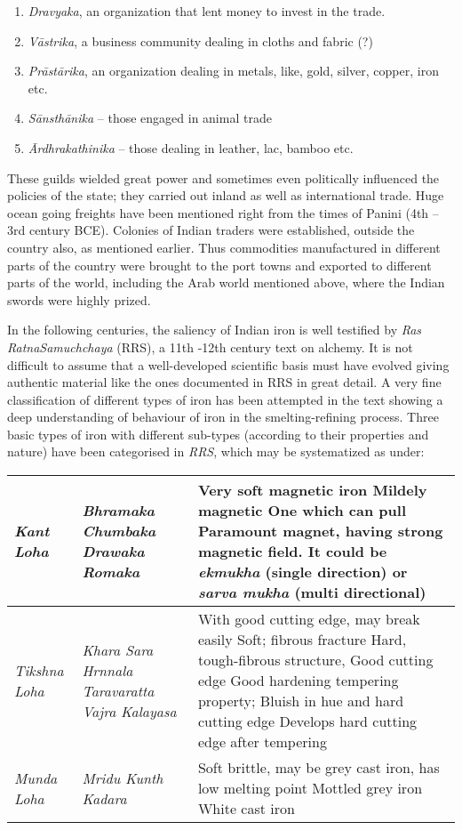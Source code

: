 \begin{enumerate}
\item \textit{Dravyaka}, an organization that lent money to invest in the trade.

 \item \textit{Vāstrika}, a business community dealing in cloths and fabric (?)

 \item \textit{Prāstārika}, an organization dealing in metals, like, gold, silver, copper, iron etc.

 \item \textit{Sānsthānika} – those engaged in animal trade

 \item \textit{Ārdhrakathinika} – those dealing in leather, lac, bamboo etc.

\end{enumerate}

These guilds wielded great power and sometimes even politically influenced the policies of the state; they carried out inland as well as international trade. Huge ocean going freights have been mentioned right from the times of Panini (4th –3rd century BCE). Colonies of Indian traders were established, outside the country also, as mentioned earlier. Thus commodities manufactured in different parts of the country were brought to the port towns and exported to different parts of the world, including the Arab world mentioned above, where the Indian swords were highly prized.

In the following centuries, the saliency of Indian iron is well testified by \textit{Ras Ratna}\textit{Samuchchaya }(RRS), a 11th -12th century text on alchemy. It is not difficult to assume that a well-developed scientific basis must have evolved giving authentic material like the ones documented in RRS in great detail. A very fine classification of different types of iron has been attempted in the text showing a deep understanding of behaviour of iron in the smelting-refining process. Three basic types of iron with different sub-types (according to their properties and nature) have been categorised in \textit{RRS}, which may be systematized as under:

\begin{longtable}{|p{1cm}|p{2.5cm}|p{5cm}|}
\hline
\textit{Kant Loha} & \textit{Bhramaka Chumbaka Drawaka Romaka} & Very soft magnetic iron Mildely magnetic One which can pull Paramount magnet, having strong magnetic field. It could be \textit{ekmukha} (single direction) or \textit{sarva mukha} (multi directional) \\
\hline
\textit{Tikshna Loha} & \textit{Khara Sara Hrnnala Taravaratta Vajra Kalayasa} & With good cutting edge, may break easily  Soft; fibrous fracture Hard, tough-fibrous structure, Good cutting edge Good hardening tempering property;  Bluish in hue and hard cutting edge Develops hard cutting edge after tempering \\
\hline
\textit{Munda Loha} & \textit{Mridu Kunth Kadara} & Soft brittle, may be grey cast iron, has low melting point Mottled grey iron White cast iron \\
\hline
\end{longtable}

